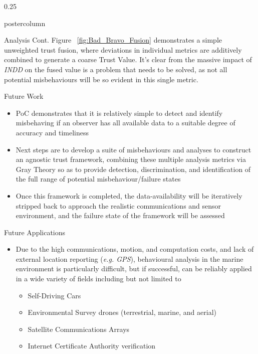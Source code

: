 \documentclass[final,hyperref={pdfpagelabels=false}]{beamer}
\def\colwidth{0.25\linewidth}
\begin{document}
\begin{frame}[fragile]
\begin{columns}[t]
\begin{column}{\colwidth}
\begin{beamercolorbox}[center,wd=\textwidth]{postercolumn}
\begin{minipage}[T]{.98\textwidth}
{\begin{block}{Analysis Cont.}
              Figure ~\ref{fig:Bad_Bravo_Fusion} demonstrates a simple unweighted trust fusion, where deviations in individual metrics are additively combined to generate a coarse Trust Value. It's clear from the massive impact of \emph{INDD} on the fused value is a problem that needs to be solved, as not all potential misbehaviours will be so evident in this single metric.
            \end{block}
            \begin{block}{Future Work}
              \begin{itemize}
                \item PoC demonstrates that it is relatively simple to detect and identify misbehaving if an observer has all available data to a suitable degree 
                  of accuracy and timeliness
                \item Next steps are to develop a suite of misbehaviours and analyses to construct an agnostic trust framework, combining these 
                  multiple analysis metrics via Gray Theory so as to provide detection, discrimination, and identification of the full range of 
                  potential misbehaviour/failure states
                \item Once this framework is completed, the data-availability will be iteratively stripped back to approach the realistic communications and sensor environment, and the failure state of the framework will be assessed
              \end{itemize}
            \end{block}           
            \begin{block}{Future Applications}
              \begin{itemize}
                \item Due to the high communications, motion, and computation costs, and lack of external location reporting (\emph{e.g. GPS}), 
                  behavioural analysis in the marine environment is particularly difficult, but if successful, can be reliably applied in a wide 
                  variety of fields including but not limited to
                \begin{itemize}
                  \item Self-Driving Cars
                  \item Environmental Survey drones (terrestrial, marine, and aerial)
                  \item Satellite Communications Arrays
                  \item Internet Certificate Authority verification

\end{itemize}
\end{itemize}
\end{block}}
\end{minipage}
\end{beamercolorbox}
\end{column}
\end{columns}
\end{frame}
\end{document}
